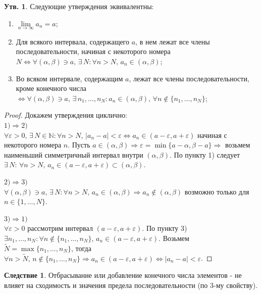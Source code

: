 \documentclass[12pt]{article}
\theoremstyle{definition}
\newtheorem{prop}{Утв.}
\newtheorem{corollary}{Следствие}
\begin{document}
\begin{prop}
	Следующие утверждения эквивалентны:
	\begin{enumerate}[label={\arabic*)}]
		\item $\lim\limits_{n \rightarrow \infty}{a_n} = a$;
		\item Для всякого интервала, содержащего $a$, в нем лежат все члены последовательности, начиная с некоторого номера $N \Leftrightarrow \forall (\alpha,\beta) \ni a, \, \exists \, N \colon \forall n > N, \, a_n \in (\alpha, \beta)$;
		\item Во всяком интервале, содержащим $a$, лежат все члены последовательности, кроме конечного числа $\Leftrightarrow \forall (\alpha,\beta) \ni a, \, \exists \, n_1, \dotsc, n_N \colon a_n \in (\alpha,\beta), \, \forall n \notin \{n_1, \dotsc, n_N\}$;
	\end{enumerate}
\end{prop}

\begin{proof}
Докажем утверждения циклично:\\
$1) \Rightarrow 2)$\\
  $\forall \varepsilon > 0,\, \exists \, N \in \mathbb{N} \colon \forall n > N, \, |a_n - a| < \varepsilon \Leftrightarrow a_n \in (a - \varepsilon, a + \varepsilon)$ начиная с некоторого номера $n$. Пусть $a \in (\alpha, \beta) \Rightarrow \varepsilon = \min\{a - \alpha,\beta - a\} \Rightarrow$ возьмем наименьший симметричный интервал внутри $(\alpha, \beta)$. По пункту 1) следует $\exists \, N\colon \, \forall n > N,\, a_n \in (a-\varepsilon, a + \varepsilon) \subset (\alpha,\beta)$.
  
$2) \Rightarrow 3)$\\ 
  $\forall (\alpha,\beta) \ni a, \, \exists \, N \colon \forall n > N, \, a_n \in (\alpha, \beta) \Rightarrow a_n \notin (\alpha, \beta)$ возможно только для $n \in \{1,\dotsc,N\}$.
  
$3) \Rightarrow 1)$\\ 
	$\forall \varepsilon > 0$ рассмотрим интервал $(a - \varepsilon, a + \varepsilon)$. По пункту 3) $\exists n_1, \dotsc ,n_N \colon \forall n \notin \{n_1,\dotsc,n_N\}, \, a_n \in (a - \varepsilon, a + \varepsilon)$. Возьмем $\tilde{N} = \max \{n_1,\dotsc,n_N\}$, тогда $\forall n > \tilde{N}, 
	\, n \notin \{n_1,\dotsc,n_N\} \Rightarrow a_n \in (a - \varepsilon, a + \varepsilon) \Leftrightarrow |a_n - a| < \varepsilon$.
\end{proof}

\begin{corollary}
	Отбрасывание или добавление конечного числа элементов - не влияет на сходимость и значения предела последовательности (по 3-му свойству).
\end{corollary}
\end{document}
